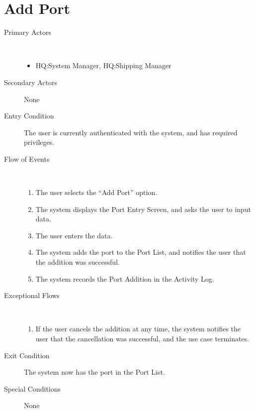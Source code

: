 \documentclass[a4paper,10pt]{report}
\begin{document}
\section{Add Port}
\begin{description}
\item[Primary Actors] \
  \begin{itemize}
  \item HQ:System Manager, HQ:Shipping Manager
  \end{itemize}
\item[Secondary Actors] None
\item[Entry Condition]
  The user is currently authenticated with the system, and has required privileges.
\item[Flow of Events] \
  \begin{enumerate}
  \item The user selects the ``Add Port'' option.
  \item The system displays the Port Entry Screen, and asks the user to input data.
  \item The user enters the data.
  \item The system adds the port to the Port List, and notifies the user that the addition was successful.
    \item The system records the Port Addition in the Activity Log.
  \end{enumerate}
\item[Exceptional Flows] \
  \begin{enumerate}
  \item If the user cancels the addition at any time, the system notifies the user that the cancellation was successful, and the use case terminates.
  \end{enumerate}
\item[Exit Condition]
  The system now has the port in the Port List.
\item[Special Conditions] None
\end{description}
\end{document}
